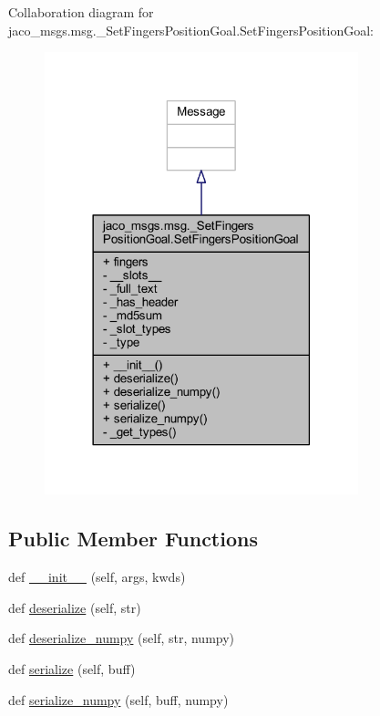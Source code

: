Collaboration diagram for jaco\+\_\+msgs.\+msg.\+\_\+\+Set\+Fingers\+Position\+Goal.\+Set\+Fingers\+Position\+Goal\+:
\nopagebreak
\begin{figure}[H]
\begin{center}
\leavevmode
\includegraphics[width=258pt]{d2/d73/classjaco__msgs_1_1msg_1_1__SetFingersPositionGoal_1_1SetFingersPositionGoal__coll__graph}
\end{center}
\end{figure}
\subsection*{Public Member Functions}
\begin{DoxyCompactItemize}
\item 
def \hyperlink{classjaco__msgs_1_1msg_1_1__SetFingersPositionGoal_1_1SetFingersPositionGoal_a09656f4b2b9739334caa1a270b85504e}{\+\_\+\+\_\+init\+\_\+\+\_\+} (self, args, kwds)
\item 
def \hyperlink{classjaco__msgs_1_1msg_1_1__SetFingersPositionGoal_1_1SetFingersPositionGoal_adebaf85a19011c8a2e4af93f165a3154}{deserialize} (self, str)
\item 
def \hyperlink{classjaco__msgs_1_1msg_1_1__SetFingersPositionGoal_1_1SetFingersPositionGoal_a4163b10532db134e92323eaebce2d192}{deserialize\+\_\+numpy} (self, str, numpy)
\item 
def \hyperlink{classjaco__msgs_1_1msg_1_1__SetFingersPositionGoal_1_1SetFingersPositionGoal_afcc60e7bd565ad358861c4a55f6c08af}{serialize} (self, buff)
\item 
def \hyperlink{classjaco__msgs_1_1msg_1_1__SetFingersPositionGoal_1_1SetFingersPositionGoal_a2affae7c8711667ca663727cb4395995}{serialize\+\_\+numpy} (self, buff, numpy)
\end{DoxyCompactItemize}
